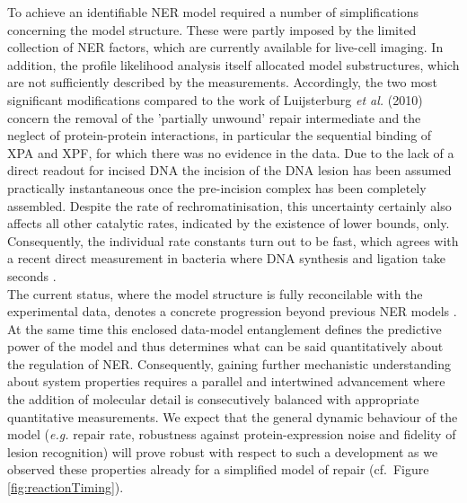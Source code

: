 To achieve an identifiable NER model required a number of simplifications concerning the model structure. These were partly imposed by the limited collection of NER factors, which are currently available for live-cell imaging. In addition, the profile likelihood analysis itself allocated model substructures, which are not sufficiently described by the measurements. Accordingly, the two most significant modifications compared to the work of Luijsterburg \textit{et al.} (2010) \cite{Luijsterburg2010} concern the removal of the 'partially unwound' repair intermediate and the neglect of protein-protein interactions, in particular the sequential binding of XPA and XPF, for which there was no evidence in the data. Due to the lack of a direct readout for incised DNA the incision of the DNA lesion has been assumed practically instantaneous once the pre-incision complex has been completely assembled. Despite the rate of rechromatinisation, this uncertainty certainly also affects all other catalytic rates, indicated by the existence of lower bounds, only. Consequently, the individual rate constants turn out to be fast, which agrees with a recent direct measurement in bacteria where DNA synthesis and ligation take seconds \cite{Uphoff2013}. \\
The current status, where the model structure is fully reconcilable with the experimental data, denotes a concrete progression beyond previous NER models \cite{Luijsterburg2010,Politi2005,Kesseler2007}. At the same time this enclosed data-model entanglement defines the predictive power of the model and thus determines what can be said quantitatively about the regulation of NER. Consequently, gaining further mechanistic understanding about system properties requires a parallel and intertwined advancement where the addition of molecular detail is consecutively balanced with appropriate quantitative measurements. We expect that the general dynamic behaviour of the model (\textit{e.g.} repair rate, robustness against protein-expression noise and fidelity of lesion recognition) will prove robust with respect to such a development as we observed these properties already for a simplified model of repair (cf.\ Figure \ref{fig:reactionTiming}).    
       

